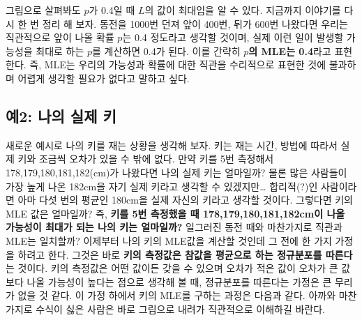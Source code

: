 \documentclass[]{book}
\begin{document}
그림으로 살펴봐도 \(p\)가 0.4일 때 \(L\)의 값이 최대임을 알 수 있다.
지금까지 이야기를 다시 한 번 정리 해 보자. 동전을 1000번 던져 앞이
400번, 뒤가 600번 나왔다면 우리는 직관적으로 앞이 나올 확률 \(p\)는 0.4
정도라고 생각할 것이며, 실제 이런 일이 발생할 가능성을 최대로 하는
\(p\)를 계산하면 0.4가 된다. 이를 간략히 \textbf{\(p\)의 MLE는 0.4}라고
표현한다. 즉, MLE는 우리의 가능성과 확률에 대한 직관을 수리적으로 표현한
것에 불과하며 어렵게 생각할 필요가 없다고 말하고 싶다.

\subsection{예2: 나의 실제
키}\label{uxc6082-uxb098uxc758-uxc2e4uxc81c-uxd0a4}

새로운 예시로 나의 키를 재는 상황을 생각해 보자. 키는 재는 시간, 방법에
따라서 실제 키와 조금씩 오차가 있을 수 밖에 없다. 만약 키를 5번 측정해서
178,179,180,181,182(cm)가 나왔다면 나의 실제 키는 얼마일까? 물론 많은
사람들이 가장 높게 나온 182cm을 자기 실제 키라고 생각할 수
있겠지만\ldots{} 합리적(?)인 사람이라면 아마 다섯 번의 평균인 180cm을
실제 자신의 키라고 생각할 것이다. 그렇다면 키의 MLE 값은 얼마일까? 즉,
\textbf{키를 5번 측정했을 때 178,179,180,181,182cm이 나올 가능성이
최대가 되는 나의 키는 얼마일까?} 일그러진 동전 때와 마찬가지로 직관과
MLE는 일치할까? 이제부터 나의 키의 MLE값을 계산할 것인데 그 전에 한 가지
가정을 하려고 한다. 그것은 바로 \textbf{키의 측정값은 참값을 평균으로
하는 정규분포를 따른다}는 것이다. 키의 측정값은 어떤 값이든 갖을 수
있으며 오차가 적은 값이 오차가 큰 값보다 나올 가능성이 높다는 점으로
생각해 볼 때, 정규분포를 따른다는 가정은 큰 무리가 없을 것 같다. 이 가정
하에서 키의 MLE를 구하는 과정은 다음과 같다. 아까와 마찬가지로 수식이
싫은 사람은 바로 그림으로 내려가 직관적으로 이해하길 바란다.
\end{document}
